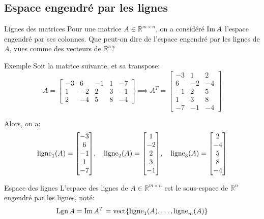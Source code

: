 \documentclass[a4paper]{article}
\begin{document}
\subsection{Espace engendré par les lignes}
\begin{parag}{Lignes des matrices}
    Pour une matrice $A \in \mathbb{R}^{m \times n}$, on a considéré $\operatorname{Im} A$ l'espace engendré par ses colonnes. Que peut-on dire de l'espace engendré par les lignes de $A$, vues comme des vecteurs de $\mathbb{R}^{n}$?
\end{parag}

\begin{parag}{Exemple}
    Soit la matrice suivante, et sa transpose:
    \[A = \begin{bmatrix} -3 & 6 & -1 & 1 & -7 \\ 1 & -2 & 2 & 3 & -1 \\ 2 & -4 & 5 & 8 & -4 \end{bmatrix} \implies A^T = \begin{bmatrix} -3 & 1 & 2 \\ 6 & -2 & -4 \\ -1 & 2 & 5 \\ 1 & 3 & 8 \\ -7 & -1 & -4 \end{bmatrix} \]

    Alors, on a:
    \[\ligne_1\left(A\right) = \begin{bmatrix} -3 \\ 6 \\ -1 \\ 1 \\ -7 \end{bmatrix}, \mathspace \ligne_2\left(A\right) = \begin{bmatrix} 1 \\ -2 \\ 2 \\ 3 \\ -1 \end{bmatrix}, \mathspace \ligne_3\left(A\right) = \begin{bmatrix} 2 \\ -4 \\ 5 \\ 8 \\ -4 \end{bmatrix} \]
\end{parag}

\begin{parag}{Espace des lignes}
    L'espace des lignes de $A \in \mathbb{R}^{m\times n}$ est le sous-espace de $\mathbb{R}^{n}$ engendré par les lignes, noté:
    \[\lgn A = \im A^T = \vect\left\{\ligne_1\left(A\right), \ldots, \ligne_m\left(A\right)\right\}\]
\end{parag}
\end{document}
